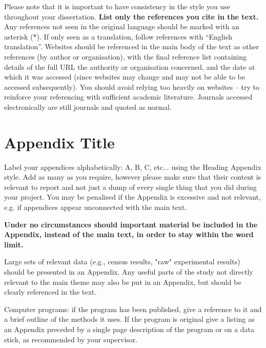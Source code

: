 \documentclass[a4paper,12pt]{article}
\begin{document}
Please note that it is important to have consistency in the style you use throughout your dissertation. \textbf{List only the references you cite in the text.} Any references not seen in the original language should be marked with an asterisk (*). If only seen as a translation, follow references with ``English translation''. Websites should be referenced in the main body of the text as other references (by author or organisation), with the final reference list containing details of the full URL the authority or organisation concerned, and the date at which it was accessed (since websites may change and may not be able to be accessed subsequently). You should avoid relying too heavily on websites – try to reinforce your referencing with sufficient academic literature. Journals accessed electronically are still journals and quoted as normal.


\clearpage


\appendix

\section{Appendix Title}
\label{sec:appendix}

Label your appendices alphabetically: A, B, C, etc... using the Heading Appendix style. Add as many as you require, however please make sure that their content is relevant to report and not just a dump of every single thing that you did during your project. You may be penalised if the Appendix is excessive and not relevant, e.g. if appendices appear unconnected with the main text.

\textbf{Under no circumstances should important material be included in the Appendix, instead of the
  main text, in order to stay within the word limit.}

Large sets of relevant data (e.g., census results, "raw" experimental results) should be presented in an Appendix. Any useful parts of the study not directly relevant to the main theme may also be put in an Appendix, but should be clearly referenced in the text. 

Computer programs: if the program has been published, give a reference to it and a brief outline of the methods it uses. If the program is original give a listing as an Appendix preceded by a single page description of the program or on a data stick, as recommended by your supervisor.
\end{document}
